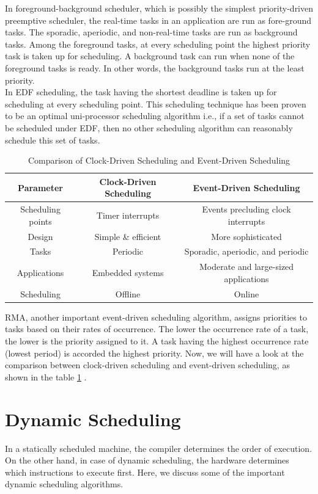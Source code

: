 \documentclass[12pt]{report}
\begin{document}
In foreground-background scheduler, which is possibly the simplest priority-driven preemptive scheduler, the real-time tasks in an application are run as fore-ground tasks. The sporadic, aperiodic, and non-real-time tasks are run as background tasks. Among the foreground tasks, at every scheduling point the highest priority task is taken up for scheduling. A background task can run when none of the foreground tasks is ready. In other words, the background tasks run at the least priority. \\

In EDF scheduling, the task having the shortest deadline is taken up for scheduling at every scheduling point. This scheduling technique has been proven to be an optimal uni-processor scheduling algorithm i.e., if a set of tasks cannot be scheduled under EDF, then no other scheduling algorithm can reasonably schedule this set of tasks.
\begin{table}[h]
\centering
\begin{tabular}{|c|c|c|}
 \hline
 \textbf{Parameter} &  \textbf{Clock-Driven Scheduling} & \textbf{Event-Driven Scheduling}\\
 \hline \hline
 Scheduling points & Timer interrupts & Events precluding clock interrupts\\ 
 \hline
 Design & Simple \& efficient & More sophisticated \\
 \hline
 Tasks & Periodic & Sporadic, aperiodic, and periodic \\
 \hline
 Applications & Embedded systems &  Moderate and
large-sized applications \\ 
 \hline
 Scheduling & Offline & Online \\
 \hline
\end{tabular}
\caption{Comparison of Clock-Driven Scheduling and Event-Driven Scheduling}
\label{table:3}
\end{table}

RMA, another important event-driven scheduling algorithm, assigns priorities to tasks based on their rates of occurrence. The lower the occurrence rate of a task, the lower is the priority assigned to it. A task having the highest occurrence rate (lowest period) is accorded the highest priority. Now, we will have a look at the comparison between clock-driven scheduling and event-driven scheduling, as shown in the table \ref{table:3} \cite{diff-clock-event}. 

\section{Dynamic Scheduling}
In a statically scheduled machine, the compiler determines the order of execution. On the other hand, in case of dynamic scheduling, the hardware determines which instructions to execute first. Here, we discuss some of the important dynamic scheduling algorithms. 
\end{document}
